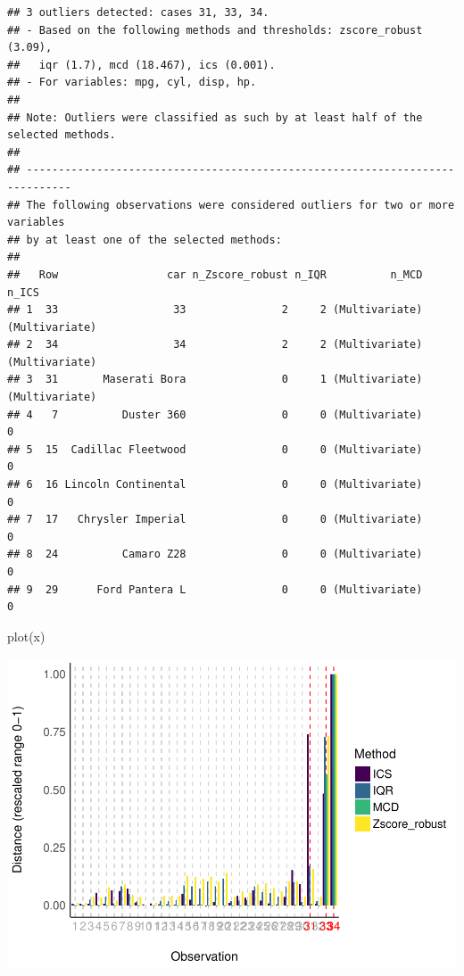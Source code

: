 \documentclass[
]{article}
\newenvironment{Shaded}{\begin{snugshade}}{\end{snugshade}}
\newcommand{\FunctionTok}[1]{\textcolor[rgb]{0.00,0.00,0.00}{#1}}
\newcommand{\NormalTok}[1]{#1}
\begin{document}
\begin{verbatim}
## 3 outliers detected: cases 31, 33, 34.
## - Based on the following methods and thresholds: zscore_robust (3.09),
##   iqr (1.7), mcd (18.467), ics (0.001).
## - For variables: mpg, cyl, disp, hp.
## 
## Note: Outliers were classified as such by at least half of the selected methods. 
## 
## -----------------------------------------------------------------------------
## The following observations were considered outliers for two or more variables 
## by at least one of the selected methods: 
## 
##   Row                 car n_Zscore_robust n_IQR          n_MCD          n_ICS
## 1  33                  33               2     2 (Multivariate) (Multivariate)
## 2  34                  34               2     2 (Multivariate) (Multivariate)
## 3  31       Maserati Bora               0     1 (Multivariate) (Multivariate)
## 4   7          Duster 360               0     0 (Multivariate)              0
## 5  15  Cadillac Fleetwood               0     0 (Multivariate)              0
## 6  16 Lincoln Continental               0     0 (Multivariate)              0
## 7  17   Chrysler Imperial               0     0 (Multivariate)              0
## 8  24          Camaro Z28               0     0 (Multivariate)              0
## 9  29      Ford Pantera L               0     0 (Multivariate)              0
\end{verbatim}

\begin{Shaded}
\begin{Highlighting}[]
\FunctionTok{plot}\NormalTok{(x)}
\end{Highlighting}
\end{Shaded}

\includegraphics{paper_files/figure-latex/multimethod-1.pdf}
\end{document}
